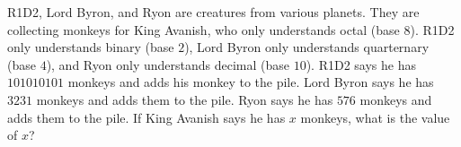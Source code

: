 R1D2, Lord Byron, and Ryon are creatures from various planets. They are collecting monkeys for King Avanish, who only understands octal (base $8$). R1D2 only understands binary (base $2$), Lord Byron only understands quarternary (base $4$), and Ryon only understands decimal (base $10$). R1D2 says he has $101010101$ monkeys and adds his monkey to the pile. Lord Byron says he has $3231$ monkeys and adds them to the pile. Ryon says he has $576$ monkeys and adds them to the pile. If King Avanish says he has $x$ monkeys, what is the value of $x$?
